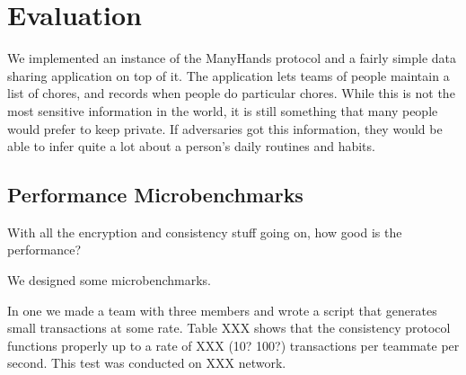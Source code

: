 \documentclass[pldi,10pt,preprint]{sigplanconf-pldi16}
\begin{document}
\section{Evaluation}

We implemented an instance of the ManyHands protocol and a fairly simple data sharing application on top of it.
The application lets teams of people maintain a list of chores, and records when people do particular chores.
While this is not the most sensitive information in the world, it is still something that many people would prefer to keep private.
If adversaries got this information, they would be able to infer quite a lot about a person's daily routines and habits.

\subsection{Performance Microbenchmarks}

With all the encryption and consistency stuff going on, how good is the performance?

We designed some microbenchmarks.

In one we made a team with three members and wrote a script that generates small transactions at some rate.
Table XXX shows that the consistency protocol functions properly up to a rate of XXX (10? 100?) transactions per teammate per second.
This test was conducted on XXX network.
\end{document}
